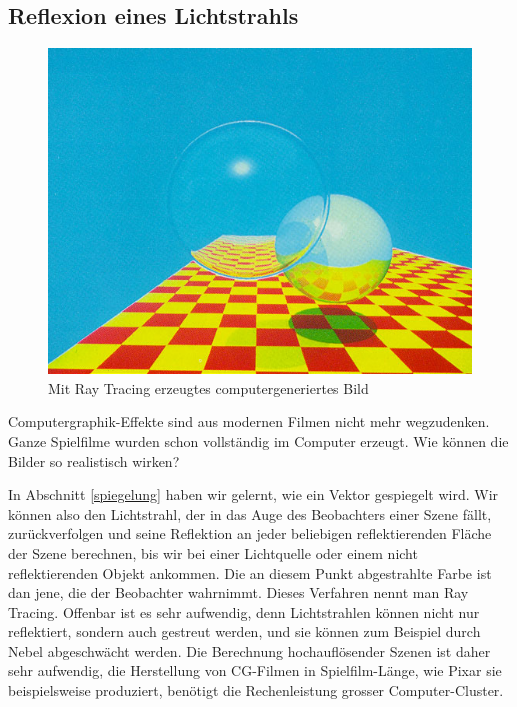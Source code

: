 %
%
\subsection{Reflexion eines Lichtstrahls}
\begin{figure}
\begin{center}
\includegraphics[width=1\hsize]{graphics/raytracing}
\end{center}
\caption{Mit Ray Tracing erzeugtes computergeneriertes Bild\label{raytracing}}
\end{figure}
Computergraphik-Effekte sind aus modernen Filmen nicht mehr wegzudenken.
Ganze Spielfilme wurden schon vollständig im Computer erzeugt.
Wie können die Bilder so realistisch wirken?

In Abschnitt \ref{spiegelung} haben wir gelernt, wie ein Vektor
gespiegelt wird.
Wir können also den Lichtstrahl, der in das Auge
des Beobachters einer Szene fällt, zurückverfolgen und seine Reflektion
an jeder beliebigen reflektierenden Fläche der Szene berechnen, bis wir bei
einer Lichtquelle oder einem nicht reflektierenden Objekt ankommen.
Die an diesem Punkt abgestrahlte Farbe ist dan jene, die der Beobachter
wahrnimmt.
Dieses Verfahren nennt man Ray Tracing.
Offenbar ist es sehr
aufwendig, denn Lichtstrahlen können nicht nur reflektiert, sondern auch
gestreut werden, und sie können zum Beispiel durch Nebel abgeschwächt
werden.
Die Berechnung hochauflösender Szenen ist daher sehr aufwendig,
die Herstellung von CG-Filmen in Spielfilm-Länge, wie Pixar sie beispielsweise
produziert, benötigt die Rechenleistung grosser Computer-Cluster.


